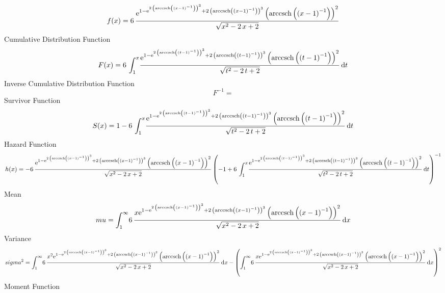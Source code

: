 \documentclass[12pt]{article}
\begin{document}
$$  f(x)=6\,{\frac {{{\rm e}^{1-{{\rm e}^{2\, \left( {\rm arccsch} \left(
 \left( x-1 \right) ^{-1}\right) \right) ^{3}}}+2\, \left( 
{\rm arccsch} \left( \left( x-1 \right) ^{-1}\right) \right) ^{3}}}
 \left( {\rm arccsch} \left( \left( x-1 \right) ^{-1}\right) \right) ^
{2}}{\sqrt {{x}^{2}-2\,x+2}}}
$$Cumulative Distribution Function  
 $$F(x)=6\,\int_{1}^{x}\!{\frac {{{\rm e}^{1-{{\rm e}^{2\, \left( 
{\rm arccsch} \left( \left( t-1 \right) ^{-1}\right) \right) ^{3}}}+2
\, \left( {\rm arccsch} \left( \left( t-1 \right) ^{-1}\right)
 \right) ^{3}}} \left( {\rm arccsch} \left( \left( t-1 \right) ^{-1}
\right) \right) ^{2}}{\sqrt {{t}^{2}-2\,t+2}}}\,{\rm d}t
$$ Inverse Cumulative Distribution Function 
  $$F^{-1} = $$Survivor Function 
 $$ S(x)=1-6\,\int_{1}^{x}\!{\frac {{{\rm e}^{1-{{\rm e}^{2\, \left( 
{\rm arccsch} \left( \left( t-1 \right) ^{-1}\right) \right) ^{3}}}+2
\, \left( {\rm arccsch} \left( \left( t-1 \right) ^{-1}\right)
 \right) ^{3}}} \left( {\rm arccsch} \left( \left( t-1 \right) ^{-1}
\right) \right) ^{2}}{\sqrt {{t}^{2}-2\,t+2}}}\,{\rm d}t
$$ Hazard Function 
 $$ h(x)=-6\,{\frac {{{\rm e}^{1-{{\rm e}^{2\, \left( {\rm arccsch} \left(
 \left( x-1 \right) ^{-1}\right) \right) ^{3}}}+2\, \left( 
{\rm arccsch} \left( \left( x-1 \right) ^{-1}\right) \right) ^{3}}}
 \left( {\rm arccsch} \left( \left( x-1 \right) ^{-1}\right) \right) ^
{2}}{\sqrt {{x}^{2}-2\,x+2}} \left( -1+6\,\int_{1}^{x}\!{\frac {{
{\rm e}^{1-{{\rm e}^{2\, \left( {\rm arccsch} \left( \left( t-1
 \right) ^{-1}\right) \right) ^{3}}}+2\, \left( {\rm arccsch} \left(
 \left( t-1 \right) ^{-1}\right) \right) ^{3}}} \left( {\rm arccsch} 
\left( \left( t-1 \right) ^{-1}\right) \right) ^{2}}{\sqrt {{t}^{2}-2
\,t+2}}}\,{\rm d}t \right) ^{-1}}
$$Mean 
 $$ mu=\int_{1}^{\infty }\!6\,{\frac {x{{\rm e}^{1-{{\rm e}^{2\, \left( 
{\rm arccsch} \left( \left( x-1 \right) ^{-1}\right) \right) ^{3}}}+2
\, \left( {\rm arccsch} \left( \left( x-1 \right) ^{-1}\right)
 \right) ^{3}}} \left( {\rm arccsch} \left( \left( x-1 \right) ^{-1}
\right) \right) ^{2}}{\sqrt {{x}^{2}-2\,x+2}}}\,{\rm d}x
$$ Variance 
 $$ sigma^2 = \int_{1}^{\infty }\!6\,{\frac {{x}^{2}{{\rm e}^{1-{{\rm e}^{2\,
 \left( {\rm arccsch} \left( \left( x-1 \right) ^{-1}\right) \right) ^
{3}}}+2\, \left( {\rm arccsch} \left( \left( x-1 \right) ^{-1}\right)
 \right) ^{3}}} \left( {\rm arccsch} \left( \left( x-1 \right) ^{-1}
\right) \right) ^{2}}{\sqrt {{x}^{2}-2\,x+2}}}\,{\rm d}x- \left( \int_
{1}^{\infty }\!6\,{\frac {x{{\rm e}^{1-{{\rm e}^{2\, \left( 
{\rm arccsch} \left( \left( x-1 \right) ^{-1}\right) \right) ^{3}}}+2
\, \left( {\rm arccsch} \left( \left( x-1 \right) ^{-1}\right)
 \right) ^{3}}} \left( {\rm arccsch} \left( \left( x-1 \right) ^{-1}
\right) \right) ^{2}}{\sqrt {{x}^{2}-2\,x+2}}}\,{\rm d}x \right) ^{2}
$$Moment Function 
\end{document}
